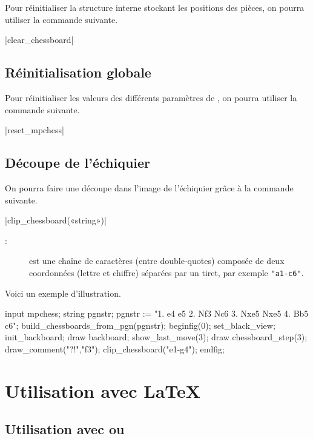 \documentclass[french]{ltxdoc}
\begin{document}
Pour réinitialiser la structure interne stockant les positions des pièces, on
pourra utiliser la commande suivante.

\commande|clear_chessboard|\smallskip


\subsection{Réinitialisation globale}

Pour réinitialiser les valeurs des différents paramètres de \mpchess, on pourra
utiliser la commande suivante.

\commande|reset_mpchess|\smallskip


\subsection{Découpe de l’échiquier}

On pourra faire une découpe dans l’image de l’échiquier grâce à la commande suivante.

\commande|clip_chessboard(«string»)|\smallskip


\begin{description}
\item[:] est une chaîne de caractères (entre double-quotes)
composée de deux coordonnées (lettre et chiffre) séparées par un tiret, par
exemple \lstinline+"a1-c6"+.
\end{description}

Voici un exemple d’illustration.
\begin{ExempleMP}
input mpchess;
string pgnstr;
pgnstr := "1. e4 e5 2. Nf3 Nc6 3. Nxe5 Nxe5 4. Bb5 c6";
build_chessboards_from_pgn(pgnstr);
beginfig(0);
set_black_view;
init_backboard;
draw backboard;
show_last_move(3);
draw chessboard_step(3); %
draw_comment("?!","f3");
clip_chessboard("e1-g4");
endfig;
\end{ExempleMP}




\section{Utilisation avec \LaTeX{}}

\subsection{Utilisation avec  ou }
\end{document}
